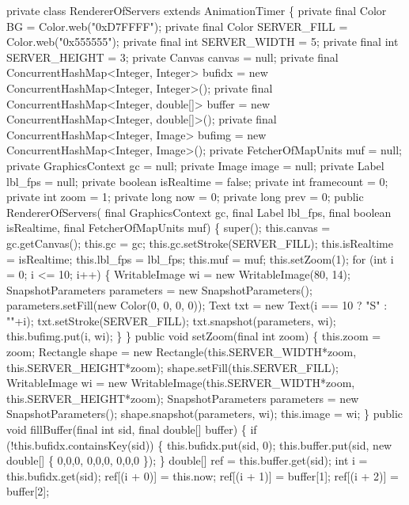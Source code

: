 \nwenddocs{}\plusendmoddef
private class RendererOfServers extends AnimationTimer \{
  private final Color BG = Color.web("0xD7FFFF");
  private final Color SERVER_FILL = Color.web("0x555555");
  private final int SERVER_WIDTH = 5;
  private final int SERVER_HEIGHT = 3;
  private Canvas canvas = null;
  private final ConcurrentHashMap<Integer, Integer>  bufidx =
      new ConcurrentHashMap<Integer, Integer>();
  private final ConcurrentHashMap<Integer, double[]> buffer =
      new ConcurrentHashMap<Integer, double[]>();
  private final ConcurrentHashMap<Integer, Image> bufimg =
      new ConcurrentHashMap<Integer, Image>();
  private FetcherOfMapUnits muf = null;
  private GraphicsContext gc = null;
  private Image image = null;
  private Label lbl_fps = null;
  private boolean isRealtime = false;
  private int framecount = 0;
  private int zoom = 1;
  private long now = 0;
  private long prev = 0;
  public RendererOfServers(
      final GraphicsContext gc, final Label lbl_fps, final boolean isRealtime,
      final FetcherOfMapUnits muf) \{
    super();
    this.canvas = gc.getCanvas();
    this.gc = gc;
    this.gc.setStroke(SERVER_FILL);
    this.isRealtime = isRealtime;
    this.lbl_fps = lbl_fps;
    this.muf = muf;
    this.setZoom(1);
    for (int i = 0; i <= 10; i++) \{
      WritableImage wi = new WritableImage(80, 14);
      SnapshotParameters parameters = new SnapshotParameters();
      parameters.setFill(new Color(0, 0, 0, 0));
      Text txt = new Text(i == 10 ? "S" : ""+i);
      txt.setStroke(SERVER_FILL);
      txt.snapshot(parameters, wi);
      this.bufimg.put(i, wi);
    \}
  \}
  public void setZoom(final int zoom) \{
    this.zoom = zoom;
    Rectangle shape = new Rectangle(this.SERVER_WIDTH*zoom, this.SERVER_HEIGHT*zoom);
    shape.setFill(this.SERVER_FILL);
    WritableImage wi = new WritableImage(this.SERVER_WIDTH*zoom, this.SERVER_HEIGHT*zoom);
    SnapshotParameters parameters = new SnapshotParameters();
    shape.snapshot(parameters, wi);
    this.image = wi;
  \}
  public void fillBuffer(final int sid, final double[] buffer) \{
    if (!this.bufidx.containsKey(sid)) \{
      this.bufidx.put(sid, 0);
      this.buffer.put(sid, new double[] \{ 0,0,0, 0,0,0, 0,0,0 \});
    \}
    double[] ref = this.buffer.get(sid);
    int i = this.bufidx.get(sid);
    ref[(i + 0)] = this.now;
    ref[(i + 1)] = buffer[1];
    ref[(i + 2)] = buffer[2];
